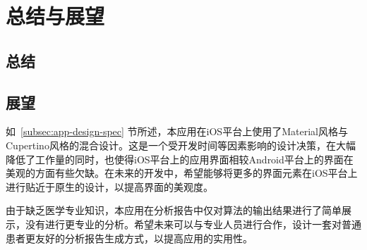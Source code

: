 \chapter{总结与展望}\label{ch:conc}


\section{总结}\label{sec:conc}



\section{展望}\label{sec:pros}


如~\ref{subsec:app-design-spec} 节所述，本应用在iOS平台上使用了Material风格与Cupertino风格的混合设计。这是一个受开发时间等因素影响的设计决策，在大幅降低了工作量的同时，也使得iOS平台上的应用界面相较Android平台上的界面在美观的方面有些欠缺。在未来的开发中，希望能够将更多的界面元素在iOS平台上进行贴近于原生的设计，以提高界面的美观度。

由于缺乏医学专业知识，本应用在分析报告中仅对算法的输出结果进行了简单展示，没有进行更专业的分析。希望未来可以与专业人员进行合作，设计一套对普通患者更友好的分析报告生成方式，以提高应用的实用性。


